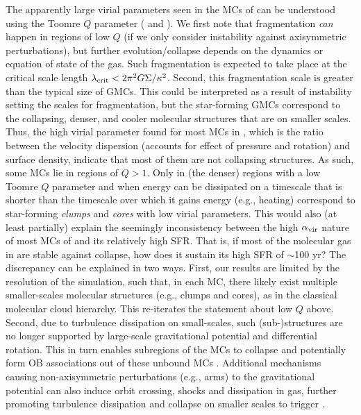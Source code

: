 \IfFileExists{emulateapjlegacy.cls}{\documentclass[iop]{emulateapjlegacy}}{\documentclass[iop]{emulateapj}}
\begin{document}
The apparently large virial parameters seen in the MCs of \flower can be understood using the 
Toomre $Q$ parameter ( and ). 
We first note that fragmentation {\it can} happen in regions of low $Q$ (if we only consider 
instability against axisymmetric perturbations), but  
further evolution/collapse depends on the dynamics or equation of state of the gas. 
Such fragmentation is expected to take place at the
critical scale length $\lambda_{\rm crit} < 2 \pi^2 G \Sigma / \kappa^2$.
Second, this fragmentation scale is greater than the typical size of GMCs. This could be interpreted as a result of instability setting the scales for fragmentation, but the star-forming GMCs
correspond to the collapsing, denser, and cooler molecular structures that are on smaller scales. 
Thus, the high virial parameter found 
for most MCs in \flower, which is the ratio between the velocity dispersion (accounts for effect of pressure 
and rotation) and surface density, indicate that most of them are not collapsing structures. 
As such, some MCs lie in regions of $Q>1$. 
Only in (the denser) regions with a low Toomre $Q$ parameter and 
when energy can be dissipated on a timescale 
that is shorter than the timescale over which it gains energy (e.g., heating) 
correspond to star-forming {\it clumps} and {\it cores} with low virial parameters.
This would also (at least partially) explain the seemingly inconsistency between the high $\alpha_{\rm vir}$
nature of most MCs of \flower and its relatively high SFR.
That is, if most of the molecular gas in \flower are stable against collapse, 
how does it sustain its high SFR of $\sim$100\,\Msun\,yr\pmOne?
The discrepancy can be explained in two ways.
First, our results are limited by the resolution of the simulation, such that, in each MC, there
likely exist multiple smaller-scales molecular structures (e.g., clumps and cores),
as in the classical molecular cloud hierarchy. This re-iterates the statement about low $Q$ above.
Second, due to turbulence dissipation on small-scales, such (sub-)structures are no longer supported by
large-scale gravitational potential and differential rotation.
This in turn enables subregions of the MCs to collapse and potentially form OB associations out of these unbound
MCs \citep{Clark04a, Clark05a}.
Additional mechanisms causing non-axisymmetric perturbations (e.g., arms) to the gravitational potential
can also induce orbit crossing, shocks and dissipation in gas, further promoting turbulence dissipation
and collapse on smaller scales to trigger \SF.
\end{document}
